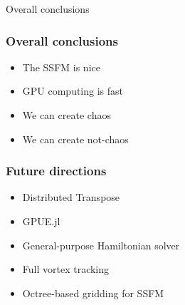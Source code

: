 \documentclass{beamer}
\begin{document}
\begin{frame}
\center \huge Overall conclusions
\end{frame}

\begin{frame}
\frametitle{Overall conclusions}

\begin{itemize}
\item The SSFM is nice
\item GPU computing is fast
\item We can create chaos
\item We can create not-chaos
\end{itemize}
\end{frame}

\begin{frame}
\frametitle{Future directions}
\begin{itemize}
\item Distributed Transpose
\item GPUE.jl
\item General-purpose Hamiltonian solver
\item Full vortex tracking
\item Octree-based gridding for SSFM
\end{itemize}
\end{frame}
\end{document}
